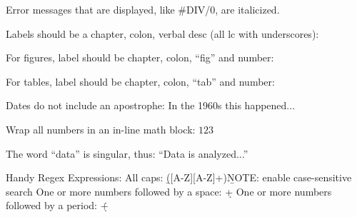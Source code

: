 Error messages that are displayed, like #DIV/0, are italicized.

Labels should be a chapter, colon, verbal desc (all lc with underscores): \label{03:title}

For figures, label should be chapter, colon, ``fig'' and number: \label{03:fig01}

For tables, label should be chapter, colon, ``tab'' and number: \label{03:tab01}

Dates do not include an apostrophe: In the 1960s this happened...

Wrap all numbers in an in-line math block: $ 123 $

The word ``data'' is singular, thus: ``Data is analyzed...''

Handy Regex Expressions:
All caps: \b([A-Z][A-Z]+)\b NOTE: enable case-sensitive search
One or more numbers followed by a space: \d+\s
One or more numbers followed by a period: \d+\.